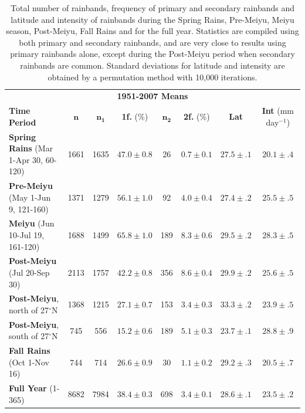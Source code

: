 \documentclass[final,grl]{agutexSI}
\begin{document}
\begin{table}

\caption{Total number of rainbands, frequency of primary and secondary rainbands and latitude and intensity of rainbands during the Spring Rains, Pre-Meiyu, Meiyu season, Post-Meiyu, Fall Rains and for the full year. Statistics are compiled using both primary and secondary rainbands, and are very close to results using primary rainbands alone, except during the Post-Meiyu period when secondary rainbands are common. Standard deviations for latitude and intensity are obtained by a permutation method with 10,000 iterations.}

\begin{tabular}{ l c c c c c c c}
	 \multicolumn{8}{c}{\textbf{1951-2007 Means}} \\
	 \textbf{Time Period} & $\boldsymbol{n}$ & $\boldsymbol{n_1}$ & \textbf{1f.} (\%) & $\boldsymbol{n_2}$ & \textbf{2f.} (\%) & \textbf{Lat} & \textbf{Int} (mm day$^{-1}$) \\
	 \hline
	\textbf{Spring Rains} (Mar 1-Apr 30, 60-120) & 1661 & 1635 & $47.0 \pm 0.8$ & 26 & $0.7 \pm 0.1$ & $27.5 \pm .1$ & $20.1 \pm .4$ \\
	\textbf{Pre-Meiyu} (May 1-Jun 9, 121-160) & 1371 & 1279 & $56.1 \pm 1.0$ & 92 & $4.0 \pm 0.4$ & $27.4 \pm .2$ & $25.5 \pm .5$ \\
	\textbf{Meiyu} (Jun 10-Jul 19, 161-120) & 1688 & 1499 &$65.8 \pm 1.0$ & 189 & $8.3 \pm 0.6$ & $29.5 \pm .2$ & $28.3 \pm .5$ \\
	\textbf{Post-Meiyu} (Jul 20-Sep 30) & 2113 & 1757 & $42.2 \pm 0.8 $ & 356 & $8.6 \pm 0.4$ & $29.9 \pm .2$ & $25.6 \pm .5$ \\
	\textbf{Post-Meiyu}, north of 27$^\circ$N & 1368 & 1215 & $27.1 \pm 0.7 $ & 153 & $3.4 \pm 0.3$ & $33.3 \pm .2$ & $23.9 \pm .5$ \\
	\textbf{Post-Meiyu}, south of 27$^\circ$N & 745 & 556 & $15.2 \pm 0.6 $ & 189 & $5.1 \pm 0.3$ & $23.7 \pm .1$ & $28.8 \pm .9$ \\
	\textbf{Fall Rains} (Oct 1-Nov 16) & 744 & 714 & $26.6 \pm 0.9 $ & 30 & $1.1 \pm 0.2$ & $29.2 \pm .3$ & $20.5 \pm .7$ \\
	\textbf{Full Year} (1-365) & 8682 & 7984 & $38.4 \pm 0.3$ & 698 & $3.4 \pm 0.1$ & $28.6 \pm .1$ & $23.5 \pm .2$ \\
\end{tabular}
\label{ts4}
\end{table}
\end{document}
